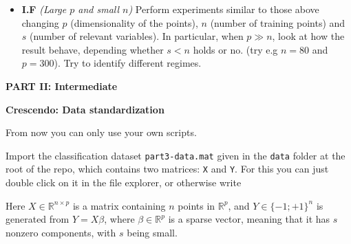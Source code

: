 \documentclass[DIN, pagenumber=false, fontsize=11pt, parskip=half]{scrartcl}
\newcommand{\mysection}[1]{\noindent\large\textbf{#1}}
\begin{document}
\begin{itemize}
	\item \textbf{I.F} \emph{(Large $p$ and small $n$)} Perform experiments similar to those above changing $p$ (dimensionality of the points), $n$ (number of training points) and $s$ (number of relevant variables).
	In particular, when $p\gg n$, look at how the result behave, depending whether $s<n$ holds or no. (try e.g $n=80$ and $p=300$). Try to identify different regimes.


\end{itemize}





\begin{center}
\large\textbf{PART II: Intermediate}
\end{center}

\mysection{Crescendo: Data standardization}

From now you can only use your own scripts.

Import the classification dataset \texttt{part3-data.mat} given in the \texttt{data} folder at the root of the repo, which contains two matrices: \texttt{X} and \texttt{Y}.
For this you can just double click on it in the file explorer, or otherwise write\\

Here $X \in \mathbb{R}^{n \times p}$ is a matrix containing $n$ points in $\mathbb{R}^p$, and $Y \in \{-1;+1\}^n$ is generated from $Y=X \beta$, where $\beta \in \mathbb{R}^p$ is a sparse vector, meaning that it has $s$ nonzero components, with $s$ being small.
\end{document}
